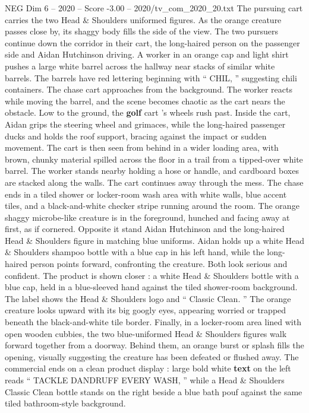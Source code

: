 \begin{textsample}{NEG Dim 6 – 2020 – Score -3.00 – 2020/tv\_com\_2020\_20.txt}
The pursuing cart carries the two Head \& Shoulders uniformed figures.
As the orange creature passes close by, its shaggy body fills the side of the view.
The two pursuers continue down the corridor in their cart, the long-haired person on the passenger side and Aidan Hutchinson driving.
A worker in an orange cap and light shirt pushes a large white barrel across the hallway near stacks of similar white barrels.
The barrels have red lettering beginning with “ CHIL, ” suggesting chili containers.
The chase cart approaches from the background.
The worker reacts while moving the barrel, and the scene becomes chaotic as the cart nears the obstacle.
Low to the ground, the \textbf{golf} cart ’s wheels rush past.
Inside the cart, Aidan grips the steering wheel and grimaces, while the long-haired passenger ducks and holds the roof support, bracing against the impact or sudden movement.
The cart is then seen from behind in a wider loading area, with brown, chunky material spilled across the floor in a trail from a tipped-over white barrel.
The worker stands nearby holding a hose or handle, and cardboard boxes are stacked along the walls.
The cart continues away through the mess.
The chase ends in a tiled shower or locker-room wash area with white walls, blue accent tiles, and a black-and-white checker stripe running around the room.
The orange shaggy microbe-like creature is in the foreground, hunched and facing away at first, as if cornered.
Opposite it stand Aidan Hutchinson and the long-haired Head \& Shoulders figure in matching blue uniforms.
Aidan holds up a white Head \& Shoulders shampoo bottle with a blue cap in his left hand, while the long-haired person points forward, confronting the creature.
Both look serious and confident.
The product is shown closer : a white Head \& Shoulders bottle with a blue cap, held in a blue-sleeved hand against the tiled shower-room background.
The label shows the Head \& Shoulders logo and “ Classic Clean. ” The orange creature looks upward with its big googly eyes, appearing worried or trapped beneath the black-and-white tile border.
Finally, in a locker-room area lined with open wooden cubbies, the two blue-uniformed Head \& Shoulders figures walk forward together from a doorway.
Behind them, an orange burst or splash fills the opening, visually suggesting the creature has been defeated or flushed away.
The commercial ends on a clean product display : large bold white \textbf{text} on the left reads “ TACKLE DANDRUFF EVERY WASH, ” while a Head \& Shoulders Classic Clean bottle stands on the right beside a blue bath pouf against the same tiled bathroom-style background.

\end{textsample}

